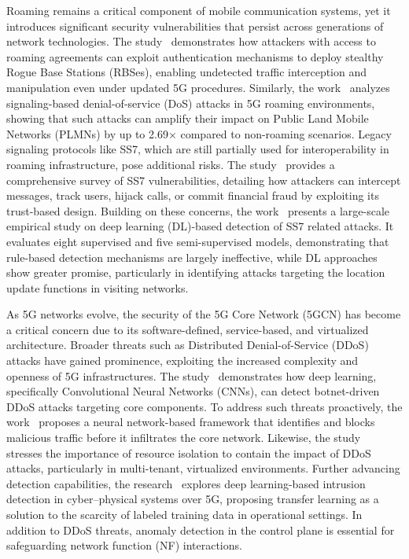 \documentclass[journal,article,submit,moreauthors,pdftex]{Definitions/tsp}
\begin{document}
Roaming remains a critical component of mobile communication systems, yet it introduces significant security vulnerabilities that persist across generations of network technologies. The study~\cite{langeWhereverMayRoam2024a} demonstrates how attackers with access to roaming agreements can exploit authentication mechanisms to deploy stealthy Rogue Base Stations (RBSes), enabling undetected traffic interception and manipulation even under updated 5G procedures. Similarly, the work~\cite{chang6GSecurityVulnerability2024} analyzes signaling-based denial-of-service (DoS) attacks in 5G roaming environments, showing that such attacks can amplify their impact on Public Land Mobile Networks (PLMNs) by up to 2.69× compared to non-roaming scenarios. Legacy signaling protocols like SS7, which are still partially used for interoperability in roaming infrastructure, pose additional risks. The study~\cite{ullahSS7VulnerabilitiesSurvey2020} provides a comprehensive survey of SS7 vulnerabilities, detailing how attackers can intercept messages, track users, hijack calls, or commit financial fraud by exploiting its trust-based design. Building on these concerns, the work~\cite{guoEmpiricalStudyDeep2023} presents a large-scale empirical study on deep learning (DL)-based detection of SS7 related attacks. It evaluates eight supervised and five semi-supervised models, demonstrating that rule-based detection mechanisms are largely ineffective, while DL approaches show greater promise, particularly in identifying attacks targeting the location update functions in visiting networks.


As 5G networks evolve, the security of the 5G Core Network (5GCN) has become a critical concern due to its software-defined, service-based, and virtualized architecture. Broader threats such as Distributed Denial-of-Service (DDoS) attacks have gained prominence, exploiting the increased complexity and openness of 5G infrastructures. The study~\cite{hussainDeepLearningBasedDDoSAttack2021} demonstrates how deep learning, specifically Convolutional Neural Networks (CNNs), can detect botnet-driven DDoS attacks targeting core components. To address such threats proactively, the work~\cite{thantharateSecure5GDeepLearning2020} proposes a neural network-based framework that identifies and blocks malicious traffic before it infiltrates the core network. Likewise, the study~\cite{sattarSecureSlicingUsing2019} stresses the importance of resource isolation to contain the impact of DDoS attacks, particularly in multi-tenant, virtualized environments. Further advancing detection capabilities, the research~\cite{farzanehDTL5GDeepTransfer2024} explores deep learning-based intrusion detection in cyber–physical systems over 5G, proposing transfer learning as a solution to the scarcity of labeled training data in operational settings. In addition to DDoS threats, anomaly detection in the control plane is essential for safeguarding network function (NF) interactions. 
\end{document}
